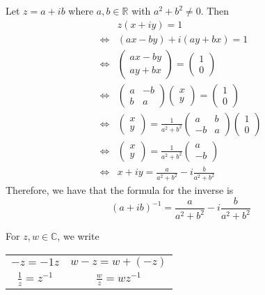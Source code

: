 \documentclass[notoc,notitlepage]{tufte-book}
\begin{document}
\begin{eg}
	Let $z = a + ib$ where $a, b \in \mathbb{R}$ with $a^2 + b^2 \neq 0$. Then
	\begin{align*}
				 & z(x + iy) = 1 \\
		\iff & (ax - by) + i(ay + bx) = 1 \\
		\iff & \begin{pmatrix} ax - by \\ ay + bx	\end{pmatrix} = \begin{pmatrix} 1 \\ 0 \end{pmatrix} \\
		\iff & \begin{pmatrix} a & -b \\ b & a \end{pmatrix}\begin{pmatrix} x \\ y \end{pmatrix} = \begin{pmatrix} 1 \\ 0 \end{pmatrix} \\
		\iff & \begin{pmatrix} x \\ y \end{pmatrix} = \frac{1}{a^2 + b^2} \begin{pmatrix} a & b \\ -b & a \end{pmatrix}	\begin{pmatrix} 1 \\ 0 \end{pmatrix} \\
		\iff & \begin{pmatrix} x \\ y \end{pmatrix} = \frac{1}{a^2 + b^2}\begin{pmatrix} a \\ -b \end{pmatrix} \\
		\iff & x + iy = \frac{a}{a^2 + b^2} - i \frac{b}{a^2 + b^2} 
	\end{align*}
	Therefore, we have that the formula for the inverse is
	\begin{equation}\label{eq:complex inverse}
		(a + ib)^{-1} = \frac{a}{a^2 +b^2} - i \frac{b}{a^2 + b^2} 
	\end{equation}
\end{eg}

\begin{notation}
	For $z, w \in \mathbb{C}$, we write
	\begin{center}
		\begin{tabular}{c c}
			$-z = -1z$ & $w - z = w + (-z)$ \\
			$\frac{1}{z} = z^{-1}$ & $\frac{w}{z} = wz^{-1}$
		\end{tabular}
	\end{center}
\end{notation}
\end{document}

